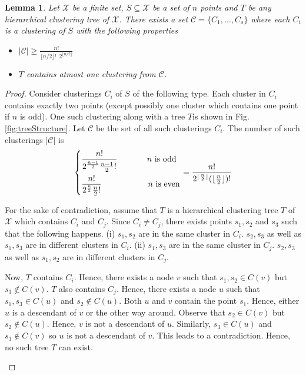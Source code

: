 \documentclass[12pt]{article}
\newtheorem{lem}[theorem]{Lemma}
\newcommand{\mc}{\mathcal}
\begin{document}
\begin{lem}
\label{lemma:treesOnX}
Let $\mc X$ be a finite set, $S \subseteq \mc X$ be a set of $n$ points and $T$ be any hierarchical clustering tree of $\mc X$. There exists a set $\mc C = \{C_1, \ldots, C_s\}$ where each $C_i$ is a clustering of $S$ with the following properties
\begin{itemize} 
	\item $|\mc C| \ge \frac{n!}{\lfloor n/2 \rfloor! \enspace 2^{\lfloor n/2 \rfloor}}$
	\item $T$ contains atmost one clustering from $\mc C$. 
\end{itemize}
\end{lem}
\begin{proof}
Consider clusterings $C_i$ of $S$ of the following type. Each cluster in $C_i$ contains exactly two points (except possibly one cluster which contains one point if $n$ is odd). One such clustering along with a tree $T$is shown in Fig. \ref{fig:treeStructure}. Let $\mc C$ be the set of all such clusterings $C_i$. The number of such clusterings $|\mc C|$ is 
$$ \begin{dcases}
		\frac{n!}{2^{\frac{n-1}{2}}\frac{n-1}{2}!} \hspace{0.5in} n \text{ is odd}\\
        \frac{n!}{2^{\frac{n}{2}}\frac{n}{2}!} \hspace{0.78in} n \text{ is even}\\
	\end{dcases}= \frac{n!}{2^{\lfloor \frac{n}{2} \rfloor} (\lfloor \frac{n}{2} \rfloor)!}$$
	
For the sake of contradiction, assume that $T$ is a hierarchical clustering tree $T$ of $\mc X$ which contains $C_i$ and $C_j$. Since $C_i \neq C_j$, there exists points $s_1, s_2$ and $s_3$ such that the following happens. (i) $s_1, s_2$ are in the same cluster in $C_i$. $s_2, s_3$ as well as $s_1, s_3$ are in different clusters in $C_i$. (ii) $s_1, s_3$ are in the same cluster in $C_j$. $s_2, s_3$ as well as $s_1, s_2$ are in different clusters in $C_j$.   

Now, $T$ contains $C_i$. Hence, there exists a node $v$ such that $s_1, s_2 \in C(v)$ but $s_3 \not\in C(v)$. $T$ also contains $C_j$. Hence, there exists a node $u$ such that $s_1, s_3 \in C(u)$ and $s_2 \not\in C(u)$. Both $u$ and $v$ contain the point $s_1$. Hence, either $u$ is a descendant of $v$ or the other way around. Observe that $s_2 \in C(v)$ but $s_2 \not\in C(u)$. Hence, $v$ is not a descendant of $u$. Similarly, $s_3 \in C(u)$ and $s_3 \not\in C(v)$ so $u$ is not a descendant of $v$. This leads to a contradiction. Hence, no such tree $T$ can exist.  
\begin{figure}
	\centering
\end{figure}
\end{proof}
\end{document}
